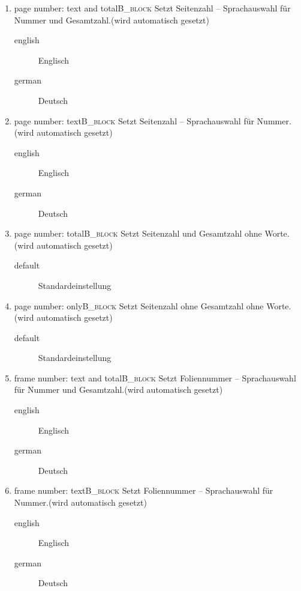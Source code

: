 \documentclass[presentation,t]{beamer}
\begin{document}
\begin{enumerate}
\item page number: text and total\hfill{}\textsc{B\_block}
\label{sec:org365277a}
Setzt Seitenzahl – Sprachauswahl für Nummer und Gesamtzahl.(wird automatisch gesetzt)
\begin{description}
\item[{english}] Englisch
\item[{german}] Deutsch
\end{description}

\item page number: text\hfill{}\textsc{B\_block}
\label{sec:orgbf077e6}
Setzt Seitenzahl – Sprachauswahl für Nummer.(wird automatisch gesetzt)
\begin{description}
\item[{english}] Englisch
\item[{german}] Deutsch
\end{description}

\item page number: total\hfill{}\textsc{B\_block}
\label{sec:org7b2cc7c}
Setzt Seitenzahl und Gesamtzahl ohne Worte.(wird automatisch gesetzt)
\begin{description}
\item[{default}] Standardeinstellung
\end{description}

\item page number: only\hfill{}\textsc{B\_block}
\label{sec:org81fa21a}
Setzt Seitenzahl ohne Gesamtzahl ohne Worte.(wird automatisch gesetzt)
\begin{description}
\item[{default}] Standardeinstellung
\end{description}

\item frame number: text and total\hfill{}\textsc{B\_block}
\label{sec:org525a4a6}
Setzt Foliennummer – Sprachauswahl für Nummer und Gesamtzahl.(wird automatisch gesetzt)
\begin{description}
\item[{english}] Englisch
\item[{german}] Deutsch
\end{description}

\item frame number: text\hfill{}\textsc{B\_block}
\label{sec:org13e5bbc}
Setzt Foliennummer – Sprachauswahl für Nummer.(wird automatisch gesetzt)
\begin{description}
\item[{english}] Englisch
\item[{german}] Deutsch
\end{description}


\end{enumerate}
\end{document}

